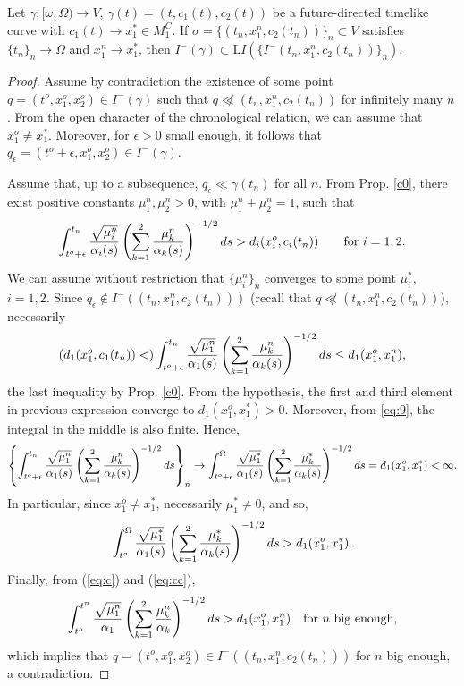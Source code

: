 \begin{lemma}\label{lemma:aux3}
Let $\gamma:[\omega,\Omega)\rightarrow V$, $\gamma(t)=(t,c_1(t),c_2(t))$ be a future-directed timelike curve with $c_1(t)\rightarrow x_1^*\in M_1^C$. If $\sigma=\{(t_n,x_1^n,c_2(t_n))\}_n\subset V$ satisfies $\{t_n\}_n\rightarrow \Omega$ and $x_1^n\rightarrow x_1^*$, then $I^-(\gamma)\subset {\mathrm LI}(\{I^-(t_n,x_1^n,c_2(t_n))\}_n)$.
\end{lemma}
\begin{proof}
Assume by contradiction the existence of some point $q=(t^o,x_1^o,x_2^o)\in I^-(\gamma)$ such that $q\not\ll (t_n,x^n_1,c_2(t_n))$ for infinitely many $n$. From the open character of the chronological relation, we can assume that $x_1^o\neq x_1^*$. Moreover, for $\epsilon>0$ small enough, it follows that $q_{\epsilon}=(t^o+\epsilon,x_1^o,x_2^o)\in I^{-}(\gamma)$.

Assume that, up to a subsequence, $q_{\epsilon}\ll \gamma(t_n)$ for all $n$. From Prop. \ref{c0}, there exist positive constants $\mu_1^n,\mu_2^n>0$, with $\mu_1^n+\mu_2^n=1$, such that
  \[
\int_{t^{o}+{\epsilon}}^{t_n} \frac{\sqrt{\mu^n_{i}}}{\alpha_{i}(s)}\left(\sum_{k=1}^{2} \frac{\mu^n_{k}}{\alpha_{k}(s)} \right)^{-1/2}ds >
d_{i}(x^{o}_{i},c_{i}(t_n))\qquad\hbox{for $i=1,2$.}
    \]
We can assume without restriction that $\{\mu_i^n\}_n$ converges to some point $\mu_i^*$, $i=1,2$. Since $q_{\epsilon}\not\in I^-((t_n,x^n_1,c_2(t_n)))$ (recall that $q\not\ll (t_n,x_1^n,c_2(t_n))$), necessarily
   \[
\left(d_{1}(x^{o}_{1},c_{1}(t_n))< \right)\int_{t^{o}+{\epsilon}}^{t_n} \frac{\sqrt{\mu^n_{1}}}{\alpha_{1}(s)}\left(\sum_{k=1}^{2} \frac{\mu^n_{k}}{\alpha_{k}(s)} \right)^{-1/2}ds\leq d_1(x_1^o,x^n_1),
      \]
      the last inequality by Prop. \ref{c0}. From the hypothesis, the first and third element in previous expression converge to $d_1(x_1^o,x_1^*)>0$. Moreover, from \eqref{eq:9}, the integral in the middle is also finite. Hence,
      \begin{equation}\label{eq:c}
\left\{\int_{t^{o}+\epsilon}^{t_n} \frac{\sqrt{\mu^n_{1}}}{\alpha_{1}(s)}\left(\sum_{k=1}^{2} \frac{\mu^n_{k}}{\alpha_{k}(s)} \right)^{-1/2}ds\right\}_n\rightarrow \int_{t^{o}+\epsilon}^{\Omega} \frac{\sqrt{\mu^*_{1}}}{\alpha_{1}(s)}\left(\sum_{k=1}^{2} \frac{\mu^*_{k}}{\alpha_{k}(s)} \right)^{-1/2}ds=d_1(x_1^o,x_1^*)<\infty.
        \end{equation}
          In particular, since $x_1^o\neq x_1^*$, necessarily $\mu_1^*\neq 0$, and so,
        \begin{equation}\label{eq:cc}
\int_{t^{o}}^{\Omega} \frac{\sqrt{\mu^*_{1}}}{\alpha_{1}(s)}\left(\sum_{k=1}^{2} \frac{\mu^*_{k}}{\alpha_{k}(s)} \right)^{-1/2}ds>d_1(x_1^o,x_1^*).
          \end{equation}
          Finally, from (\ref{eq:c}) and (\ref{eq:cc}),
        \[
\int_{t^o}^{t^n}\frac{\sqrt{\mu_1^n}}{\alpha_1}\left(\sum_{k=1}^{2}\frac{\mu_k^n}{\alpha_k}\right)^{-1/2}ds>d_1(x_1^o,x^n_1)\quad\hbox{for $n$ big enough,}
          \]
which implies that $q=(t^o,x_1^o,x_2^o)\in I^-((t_n,x^n_1,c_2(t_n)))$ for $n$ big enough, a contradiction.
\end{proof}

